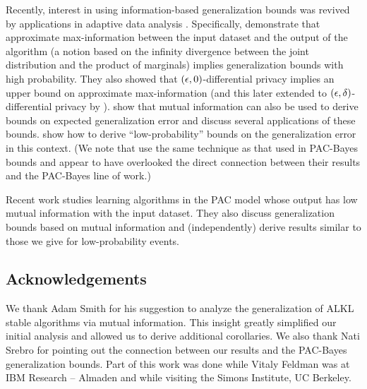 \documentclass[final,12pt]{colt2018}
\begin{document}
Recently, interest in using information-based generalization bounds was revived by applications in adaptive data analysis \citep{DworkFHPRR15:arxiv}.
Specifically, \citet{DworkFHPRR15:arxiv} demonstrate that approximate max-information  between the input dataset and the output of the algorithm (a notion based on the infinity divergence between the joint distribution and the product of marginals) implies generalization bounds with high probability. They also showed that $(\epsilon,0)$-differential privacy implies an upper bound on approximate max-information (and this later extended to $(\epsilon,\delta)$-differential privacy by \citet{RogersRST16}). \citet{RussoZ16} show that mutual information can also be used to derive bounds on expected generalization error and discuss several applications of these bounds. \citet{XuR17} show how to derive ``low-probability'' bounds on the generalization error in this context. (We note that \citep{RussoZ16,XuR17} use the same technique as that used in PAC-Bayes bounds and appear to have overlooked the direct connection between their results and the PAC-Bayes line of work.)

Recent work \citep{BassilyMNSY18} studies learning algorithms in the PAC model whose output has low mutual information with the input dataset. They also discuss generalization bounds based on mutual information and (independently) derive results similar to those we give for low-probability events.




\subsection*{Acknowledgements} We thank Adam Smith for his suggestion to analyze the generalization of ALKL stable algorithms via mutual information. This insight greatly simplified our initial analysis and allowed us to derive additional corollaries. We also thank Nati Srebro for pointing out the connection between our results and the PAC-Bayes generalization bounds.
Part of this work was done while Vitaly Feldman was at IBM Research -- Almaden and while visiting the Simons Institute, UC Berkeley.

%




\end{document}
